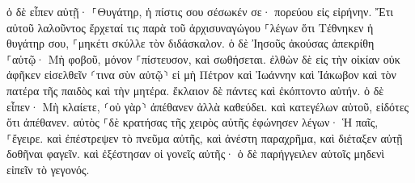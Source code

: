 \documentclass{openreader}
\begin{document}
ὁ δὲ εἶπεν αὐτῇ· ⸀Θυγάτηρ, ἡ πίστις σου σέσωκέν σε· πορεύου εἰς εἰρήνην. 
Ἔτι αὐτοῦ λαλοῦντος ἔρχεταί τις παρὰ τοῦ ἀρχισυναγώγου ⸀λέγων ὅτι Τέθνηκεν ἡ θυγάτηρ σου, ⸀μηκέτι σκύλλε τὸν διδάσκαλον. 
ὁ δὲ Ἰησοῦς ἀκούσας ἀπεκρίθη ⸀αὐτῷ· Μὴ φοβοῦ, μόνον ⸀πίστευσον, καὶ σωθήσεται. 
ἐλθὼν δὲ εἰς τὴν οἰκίαν οὐκ ἀφῆκεν εἰσελθεῖν ⸂τινα σὺν αὐτῷ⸃ εἰ μὴ Πέτρον καὶ Ἰωάννην καὶ Ἰάκωβον καὶ τὸν πατέρα τῆς παιδὸς καὶ τὴν μητέρα. 
ἔκλαιον δὲ πάντες καὶ ἐκόπτοντο αὐτήν. ὁ δὲ εἶπεν· Μὴ κλαίετε, ⸂οὐ γὰρ⸃ ἀπέθανεν ἀλλὰ καθεύδει. 
καὶ κατεγέλων αὐτοῦ, εἰδότες ὅτι ἀπέθανεν. 
αὐτὸς ⸀δὲ κρατήσας τῆς χειρὸς αὐτῆς ἐφώνησεν λέγων· Ἡ παῖς, ⸀ἔγειρε. 
καὶ ἐπέστρεψεν τὸ πνεῦμα αὐτῆς, καὶ ἀνέστη παραχρῆμα, καὶ διέταξεν αὐτῇ δοθῆναι φαγεῖν. 
καὶ ἐξέστησαν οἱ γονεῖς αὐτῆς· ὁ δὲ παρήγγειλεν αὐτοῖς μηδενὶ εἰπεῖν τὸ γεγονός. 
\end{document}
